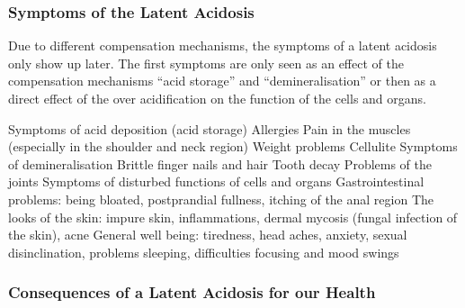 \documentclass[../main.tex]{subfiles}
\begin{document}
\subsubsection{Symptoms of the Latent Acidosis}

Due to different compensation mechanisms, the symptoms of a latent acidosis only show up later.
The first symptoms are only seen as an effect of the compensation mechanisms ``acid storage'' and ``demineralisation''
or then as a direct effect of the over acidification on the function of the cells and organs.

\begin{outline}
  \1 Symptoms of acid deposition (acid storage)
  \2 Allergies
  \2 Pain in the muscles (especially in the shoulder and neck region)
  \2 Weight problems
  \2 Cellulite
  \1Symptoms of demineralisation
  \2 Brittle finger nails and hair
  \2 Tooth decay
  \2 Problems of the joints
  \1 Symptoms of disturbed functions of cells and organs
  \2 Gastrointestinal problems: being bloated, postprandial fullness,
  itching of the anal region
  \2 The looks of the skin: impure skin, inflammations, dermal mycosis (fungal infection of the skin),
  acne
  \2 General well being: tiredness, head aches, anxiety,
  sexual disinclination, problems sleeping, difficulties focusing
  and mood swings
  \end{outline}

  \subsubsection{Consequences of a Latent Acidosis for our Health}
  
\end{document}
